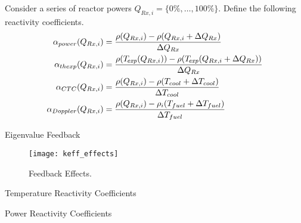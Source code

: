 \begin{frame}
  Consider a series of reactor powers $Q_{Rx,i} = \{0\%,\ldots,100\%\}$.
  Define the following reactivity coefficients.
  \begin{align}
    \label{eq:power_reactivity_coefficient}
    \alpha_{power}(Q_{Rx,i}) &= \frac{\rho(Q_{Rx,i}) - \rho(Q_{Rx,i} + 
      \Delta Q_{Rx})} {\Delta Q_{Rx}} \\
    \label{eq:thermal_expansion_reactivity_coefficient}
    \alpha_{thexp}(Q_{Rx,i}) &= \frac{\rho({T_{\!\mbox{\scriptsize \em exp}}}(Q_{Rx,i})) -
      \rho({T_{\!\mbox{\scriptsize \em exp}}}(Q_{Rx,i} + \Delta Q_{Rx}))}{\Delta Q_{Rx}} \\
    \label{eq:doppler_reactivity_coefficient}
    \alpha_{CTC}(Q_{Rx,i}) &= \frac{\rho(Q_{Rx,i}) - \rho(T_{cool} + 
      \Delta T_{cool})} {\Delta T_{cool}} \\
    \label{eq:coolant_temperature_reactivity_coefficient}
    \alpha_{Doppler}(Q_{Rx,i}) &= \frac{\rho(Q_{Rx,i}) - \rho_i(T_{fuel} + 
      \Delta T_{fuel})} {\Delta T_{fuel}}
  \end{align}
\end{frame}

\begin{frame}{Eigenvalue Feedback}
  \begin{figure}
    \centering
    \texttt{[image: keff\_effects]}
    \caption{\keff Feedback Effects.}
    \label{fig:keff_effects}
  \end{figure}
\end{frame}

\begin{frame}{Temperature Reactivity Coefficients}
  \begin{figure}
    \centering
  \end{figure}
\end{frame}

\begin{frame}{Power Reactivity Coefficients}
  \begin{figure}
    \centering
  \end{figure}
\end{frame}
